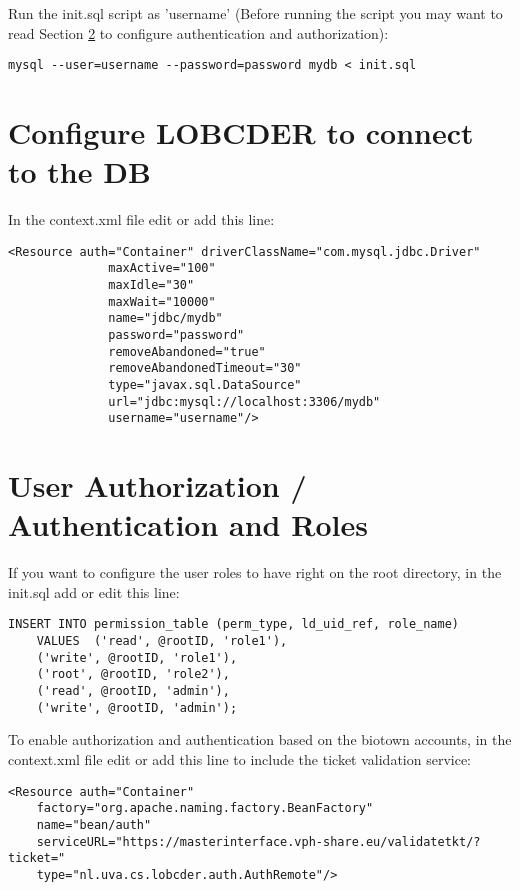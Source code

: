 \documentclass[a4paper,10pt]{article}
\begin{document}
Run the init.sql script as 'username' (Before running the script you may want to read Section \ref{sec:auth} to configure authentication and authorization): 

\begin{lstlisting}
mysql --user=username --password=password mydb < init.sql
\end{lstlisting}

\section{Configure LOBCDER to connect to the DB}
In the context.xml file edit or add this line:

\begin{lstlisting}
<Resource auth="Container" driverClassName="com.mysql.jdbc.Driver" 
			  maxActive="100" 
			  maxIdle="30" 
			  maxWait="10000" 
			  name="jdbc/mydb" 
			  password="password"
			  removeAbandoned="true"
			  removeAbandonedTimeout="30" 
			  type="javax.sql.DataSource" 
			  url="jdbc:mysql://localhost:3306/mydb" 
			  username="username"/>
\end{lstlisting}


\section{User Authorization / Authentication and Roles}\label{sec:auth}

If you want to configure the user roles to have right on the root directory, in the init.sql add or edit this line: 

\begin{lstlisting}
INSERT INTO permission_table (perm_type, ld_uid_ref, role_name) 
	VALUES  ('read', @rootID, 'role1'),
	('write', @rootID, 'role1'),
	('root', @rootID, 'role2'),
	('read', @rootID, 'admin'),
	('write', @rootID, 'admin');
\end{lstlisting}

To enable authorization and authentication based on the biotown accounts, in the context.xml file edit or add this line to include the ticket validation service:

\begin{lstlisting}
<Resource auth="Container" 
    factory="org.apache.naming.factory.BeanFactory" 
    name="bean/auth" 
    serviceURL="https://masterinterface.vph-share.eu/validatetkt/?ticket="
    type="nl.uva.cs.lobcder.auth.AuthRemote"/>  
\end{lstlisting}
\end{document}
